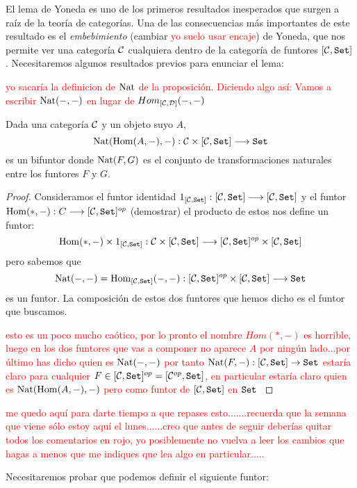 El lema de Yoneda es uno de los primeros resultados
inesperados que surgen a raíz de la teoría de categorías. Una
de las consecuencias más importantes de este resultado es
el \textit{embebimiento} (cambiar \textcolor{red}{yo suelo usar encaje}) de Yoneda, que nos permite
ver una categoría $\mathcal{C}$ cualquiera dentro de la categoría de
funtores $[\mathcal{C}, \texttt{Set}]$. Necesitaremos algunos resultados
previos para enunciar el lema:

\textcolor{red}{yo sacaría la definicion de $\operatorname{Nat}$ de la proposición. Diciendo algo así: Vamos a escribir $\operatorname{Nat}(-,-)$ en lugar de $Hom_{[\mathcal{C},\mathcal{D}]}(-,-)$}

\begin{proposition*}
  Dada una categoría $\mathcal{C}$ y un objeto suyo
  $A$,
  $$\operatorname{Nat}(\operatorname{Hom}(A, -), -) : \mathcal{C} \times [\mathcal{C}, \texttt{Set}]\longrightarrow \texttt{Set}$$
  es un bifuntor donde $\operatorname{Nat}(F, G)$ es el conjunto de transformaciones
  naturales entre los funtores $F$ y $G$.
\end{proposition*}
\begin{proof}
  Consideramos el funtor identidad
  $1_{[\mathcal{C}, \texttt{Set}]} :[\mathcal{C}, \texttt{Set}]\longrightarrow [\mathcal{C}, \texttt{Set}]$ y el funtor
  $\operatorname{Hom}(*, -) : C\longrightarrow [\mathcal{C}, \texttt{Set}]^{op}$ (demostrar)
  el producto de estos nos define un funtor:
  $$\operatorname{Hom}(*, -)\times 1_{[\mathcal{C}, \texttt{Set}]} :
  \mathcal{C}\times [\mathcal{C}, \texttt{Set}]\longrightarrow  [\mathcal{C}, \texttt{Set}]^{op} \times [\mathcal{C}, \texttt{Set}]$$
  pero sabemos que
  $$\operatorname{Nat}(-, -) = \operatorname{Hom}_{[\mathcal{C}, \texttt{Set}]}(-, -) :
    [\mathcal{C}, \texttt{Set}]^{op}\times[\mathcal{C}, \texttt{Set}]\longrightarrow \texttt{Set}$$
    es un funtor. La composición de estos dos funtores
    que hemos dicho es el funtor que buscamos.
    
 \textcolor{red}{esto es un poco mucho caótico, por lo pronto el nombre $Hom(*,-) $ es horrible, luego en los dos funtores que vas a componer no aparece $A$ por ningún lado...por último has dicho quien es $\operatorname{Nat}(-,-)$ por tanto $\operatorname{Nat}(F,-):[\mathcal{C} ,\texttt{Set}]\rightarrow \texttt{Set}$ estaría claro para cualquier $F\in [\mathcal{C} ,\texttt{Set}]^{op}=[\mathcal{C}^{op},\texttt{Set}]$, en particular estaría claro quien es $\operatorname{Nat}(\operatorname{Hom}(A, -), -)$ pero como funtor de  $[\mathcal{C}, \texttt{Set}]$ en $\texttt{Set}$  }
\end{proof}

\textcolor{red}{me quedo aquí para darte tiempo a que repases esto.......recuerda que la semana que viene sólo estoy aquí el lunes......creo que antes de seguir deberías quitar todos los comentarios en rojo, yo posiblemente no vuelva a leer los cambios que hagas a menos que me indiques que lea algo en particular.....}



Necesitaremos probar que podemos definir el siguiente funtor:

